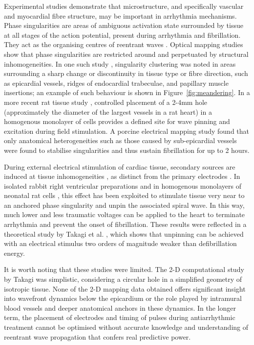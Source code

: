     Experimental studies demonstrate that microstructure, and specifically vascular and myocardial fibre structure, may be important in arrhythmia mechanisms. Phase singularities are areas of ambiguous activation state surrounded by tissue at all stages of the action potential, present during arrhythmia and fibrillation. They act as the organising centres of reentrant waves \cite{Gray1998}. Optical mapping studies show that phase singularities are restricted around and perpetuated by structural inhomogeneities. In one such study \cite{Valderrabano2003}, singularity clustering was noted in areas surrounding a sharp change or discontinuity in tissue type or fibre direction, such as epicardial vessels, ridges of endocardial trabeculae, and papillary muscle insertions; an example of such behaviour is shown in Figure~\ref{fig:meandering}. In a more recent rat tissue study \cite{Cysyk2008}, controlled placement of a 2-4mm hole (approximately the diameter of the largest vessels in a rat heart) in a homogenous monolayer of cells provides a defined site for wave pinning and excitation during field stimulation. A porcine electrical mapping study \cite{Qin2005} found that only anatomical heterogeneities such as those caused by sub-epicardial vessels were found to stabilise singularities and thus sustain fibrillation for up to 2 hours.

    During external electrical stimulation of cardiac tissue, secondary sources are induced at tissue inhomogeneities \cite{Sobie1997}, as distinct from the primary electrodes \cite{Roth1998}. In isolated rabbit right ventricular preparations \cite{Ripplinger2006} and in homogenous monolayers of neonatal rat cells \cite{Cysyk2008}, this effect has been exploited to stimulate tissue very near to an anchored phase singularity and unpin the associated spiral wave. In this way, much lower and less traumatic voltages can be applied to the heart to terminate arrhythmia and prevent the onset of fibrillation. These results were reflected in a theoretical study by Takagi et al. \cite{Takagi2004}, which shows that unpinning can be achieved with an electrical stimulus two orders of magnitude weaker than defibrillation energy.
    
    It is worth noting that these studies were limited. The 2-D computational study by Takagi \cite{Takagi2004} was simplistic, considering a circular hole in a simplified geometry of isotropic tissue. None of the 2-D mapping data obtained offers significant insight into wavefront dynamics below the epicardium or the role played by intramural blood vessels and deeper anatomical anchors in these dynamics. In the longer term, the placement of electrodes and timing of pulses during antiarrhythmic treatment cannot be optimised without accurate knowledge and understanding of reentrant wave propagation that confers real predictive power.
    
